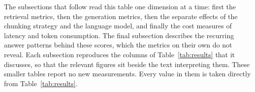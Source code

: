 \begin{table}[ht]
\centering
{}
\caption{Mean evaluation scores for all six configurations. Higher is better for all metrics except latency and token counts, where lower is better.}
\label{tab:results}
\end{table}

The subsections that follow read this table one dimension at a time: first the retrieval metrics, then the generation metrics, then the separate effects of the chunking strategy and the language model, and finally the cost measures of latency and token consumption. The final subsection describes the recurring answer patterns behind these scores, which the metrics on their own do not reveal. Each subsection reproduces the columns of Table~\ref{tab:results} that it discusses, so that the relevant figures sit beside the text interpreting them. These smaller tables report no new measurements. Every value in them is taken directly from Table~\ref{tab:results}.

